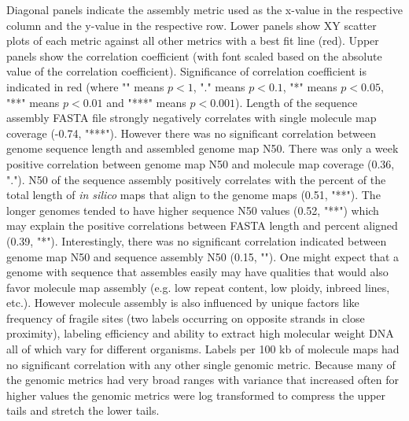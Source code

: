 Diagonal panels indicate the assembly metric used as the x-value in the respective column and the y-value in the respective row. Lower panels show XY scatter plots of each metric against all other metrics with a best fit line (red). Upper panels show the correlation coefficient (with font scaled based on the absolute value of the correlation coefficient). Significance of correlation coefficient is indicated in red (where "" means $p< 1$, "." means $p< 0.1$, "*" means $p< 0.05$, "**" means $p< 0.01$ and "***" means $p< 0.001$).
Length of the sequence assembly FASTA file strongly negatively correlates with single molecule map coverage (-0.74, "***"). However there was no significant correlation between genome sequence length and assembled genome map N50. There was only a week positive correlation between genome map N50 and molecule map coverage (0.36, "."). 
N50 of the sequence assembly positively correlates with the percent of the total length of \textit{in silico} maps that align to the genome maps (0.51, "**"). The longer genomes tended to have higher sequence N50 values (0.52, "**") which may explain the positive correlations between FASTA length and percent aligned (0.39, "*").
Interestingly, there was no significant correlation indicated between genome map N50 and sequence assembly N50 (0.15, ""). One might expect that a genome with sequence that assembles easily may have qualities that would also favor molecule map assembly (e.g. low repeat content, low ploidy, inbreed lines, etc.). However molecule assembly is also influenced by unique factors like frequency of fragile sites (two labels occurring on opposite strands in close proximity), labeling efficiency and ability to extract high molecular weight DNA all of which vary for different organisms.
Labels per 100 kb of molecule maps had no significant correlation with any other single genomic metric.
Because many of the genomic metrics had very broad ranges with variance that increased often for higher values the genomic metrics were log transformed to compress the upper tails and stretch the lower tails.